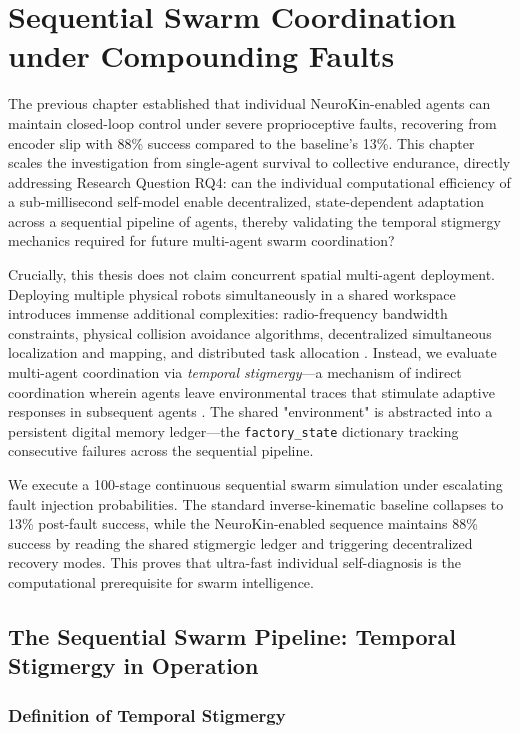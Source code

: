\documentclass[12pt,a4paper,oneside]{report}
\begin{document}
\chapter{Sequential Swarm Coordination under Compounding Faults}

The previous chapter established that individual NeuroKin-enabled agents can maintain closed-loop control under severe proprioceptive faults, recovering from encoder slip with 88\% success compared to the baseline's 13\%. This chapter scales the investigation from single-agent survival to collective endurance, directly addressing Research Question RQ4: can the individual computational efficiency of a sub-millisecond self-model enable decentralized, state-dependent adaptation across a sequential pipeline of agents, thereby validating the temporal stigmergy mechanics required for future multi-agent swarm coordination?

Crucially, this thesis does not claim concurrent spatial multi-agent deployment. Deploying multiple physical robots simultaneously in a shared workspace introduces immense additional complexities: radio-frequency bandwidth constraints, physical collision avoidance algorithms, decentralized simultaneous localization and mapping, and distributed task allocation \cite{matsuki2024gaussian, keetha2024splattam}. Instead, we evaluate multi-agent coordination via \textit{temporal stigmergy}—a mechanism of indirect coordination wherein agents leave environmental traces that stimulate adaptive responses in subsequent agents \cite{bongard2006resilient}. The shared "environment" is abstracted into a persistent digital memory ledger—the \texttt{factory\_state} dictionary tracking consecutive failures across the sequential pipeline.

We execute a 100-stage continuous sequential swarm simulation under escalating fault injection probabilities. The standard inverse-kinematic baseline collapses to 13\% post-fault success, while the NeuroKin-enabled sequence maintains 88\% success by reading the shared stigmergic ledger and triggering decentralized recovery modes. This proves that ultra-fast individual self-diagnosis is the computational prerequisite for swarm intelligence.

\section{The Sequential Swarm Pipeline: Temporal Stigmergy in Operation}

\subsection{Definition of Temporal Stigmergy}
\end{document}
